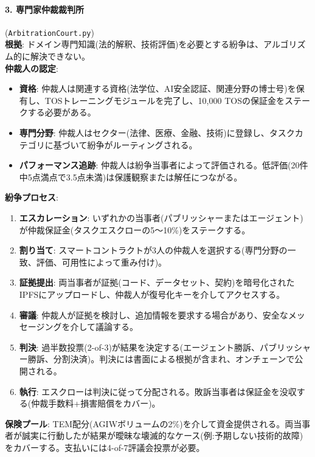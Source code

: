 \documentclass[11pt]{article}
\begin{document}
\paragraph{3. 専門家仲裁裁判所} (\texttt{ArbitrationCourt.py})\\
\textbf{根拠}: ドメイン専門知識(法的解釈、技術評価)を必要とする紛争は、アルゴリズム的に解決できない。\\
\textbf{仲裁人の認定}:
\begin{itemize}[noitemsep]
  \item \textbf{資格}: 仲裁人は関連する資格(法学位、AI安全認証、関連分野の博士号)を保有し、TOSトレーニングモジュールを完了し、10,000 TOSの保証金をステークする必要がある。
  \item \textbf{専門分野}: 仲裁人はセクター(法律、医療、金融、技術)に登録し、タスクカテゴリに基づいて紛争がルーティングされる。
  \item \textbf{パフォーマンス追跡}: 仲裁人は紛争当事者によって評価される。低評価(20件中5点満点で3.5点未満)は保護観察または解任につながる。
\end{itemize}
\textbf{紛争プロセス}:
\begin{enumerate}[noitemsep]
  \item \textbf{エスカレーション}: いずれかの当事者(パブリッシャーまたはエージェント)が仲裁保証金(タスクエスクローの5〜10\%)をステークする。
  \item \textbf{割り当て}: スマートコントラクトが3人の仲裁人を選択する(専門分野の一致、評価、可用性によって重み付け)。
  \item \textbf{証拠提出}: 両当事者が証拠(コード、データセット、契約)を暗号化されたIPFSにアップロードし、仲裁人が復号化キーを介してアクセスする。
  \item \textbf{審議}: 仲裁人が証拠を検討し、追加情報を要求する場合があり、安全なメッセージングを介して議論する。
  \item \textbf{判決}: 過半数投票(2-of-3)が結果を決定する(エージェント勝訴、パブリッシャー勝訴、分割決済)。判決には書面による根拠が含まれ、オンチェーンで公開される。
  \item \textbf{執行}: エスクローは判決に従って分配される。敗訴当事者は保証金を没収する(仲裁手数料+損害賠償をカバー)。
\end{enumerate}
\textbf{保険プール}: TEM配分(AGIWボリュームの2\%)を介して資金提供される。両当事者が誠実に行動したが結果が曖昧な壊滅的なケース(例:予期しない技術的故障)をカバーする。支払いには4-of-7評議会投票が必要。
\end{document}

